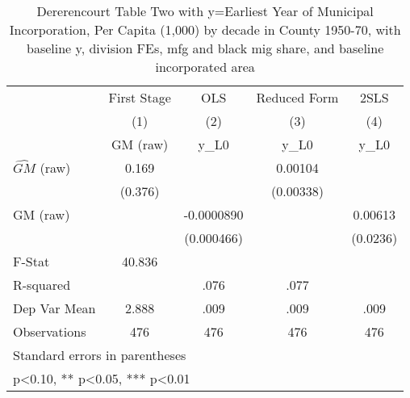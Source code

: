 \begin{table}[htbp]\centering
\def\sym#1{\ifmmode^{#1}\else\(^{#1}\)\fi}
\caption{Dererencourt Table Two with y=Earliest Year of Municipal Incorporation, Per Capita (1,000) by decade in County 1950-70, with baseline y, division FEs, mfg and black mig share, and baseline incorporated area}
\begin{tabular}{l*{4}{c}}
\toprule
                    & First Stage   &         OLS   &Reduced Form   &        2SLS   \\
                    &\multicolumn{1}{c}{(1)}&\multicolumn{1}{c}{(2)}&\multicolumn{1}{c}{(3)}&\multicolumn{1}{c}{(4)}\\
                    &\multicolumn{1}{c}{GM  (raw)}&\multicolumn{1}{c}{y\_L0}&\multicolumn{1}{c}{y\_L0}&\multicolumn{1}{c}{y\_L0}\\
\midrule
$\hat{GM}$ (raw)    &       0.169   &               &     0.00104   &               \\
                    &     (0.376)   &               &   (0.00338)   &               \\
\addlinespace
GM  (raw)           &               &  -0.0000890   &               &     0.00613   \\
                    &               &  (0.000466)   &               &    (0.0236)   \\
\midrule
F-Stat              &      40.836   &               &               &               \\
R-squared           &               &        .076   &        .077   &               \\
Dep Var Mean        &       2.888   &        .009   &        .009   &        .009   \\
Observations        &         476   &         476   &         476   &         476   \\
\bottomrule
\multicolumn{5}{l}{\footnotesize Standard errors in parentheses}\\
\multicolumn{5}{l}{\footnotesize * p<0.10, ** p<0.05, *** p<0.01}\\
\end{tabular}
\end{table}
